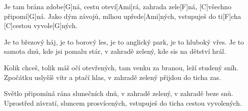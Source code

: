 
\sloka
Je tam brána zdobe[G]ná, cestu oteví[Ami]rá,
zahrada zele[F]ná, [C]všechno připomí[G]ná.
Jako dým závojů, mlhou upřede[Ami]ných,
vstupuješ do ti[F]cha [C]cestou vyvole[G]ných.

\sloka
Je to březový háj, je to borový les,
je to anglický park, je to hluboký vřes.
Je to samota dnů, kde jsi pomalu stár,
v zahradě zelený, kde sis na dětství hrál.

\sloka
Kolik chceš, tolik máš očí otevřených,
tam venku za branou, leží studený sníh.
Zpočátku uslyšíš vítr a ptačí hlas,
v zahradě zelený přijdou do ticha zas.

\sloka
Světlo připomíná rána slunečních dnů,
v zahradě zelený, v zahradě beze snů.
Uprostřed závratí, sluncem prosvícených,
vstupuješ do ticha cestou vyvolených.
